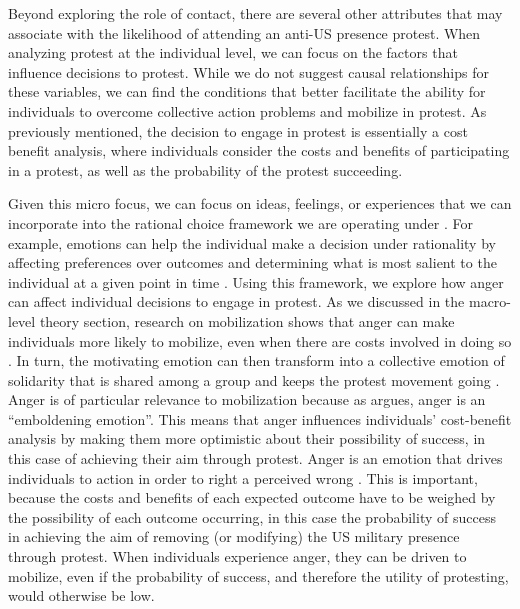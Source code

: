 Beyond exploring the role of contact, there are several other attributes that may associate with the likelihood of attending an anti-US presence protest. When analyzing protest at the individual level, we can focus on the factors that influence decisions to protest. While we do not suggest causal relationships for these variables, we can find the conditions that better facilitate the ability for individuals to overcome collective action problems and mobilize in protest. As previously mentioned, the decision to engage in protest is essentially a cost benefit analysis, where individuals consider the costs and benefits of participating in a protest, as well as the probability of the protest succeeding.
 
Given this micro focus, we can focus on ideas, feelings, or experiences that we can incorporate into the rational choice framework we are operating under \cite{Elster1999}. For example, emotions can help the individual make a decision under rationality by affecting preferences over outcomes and determining what is most salient to the individual at a given point in time \cite{deSousa1990,Pearlman2013}. Using this framework, we explore how anger can affect individual decisions to engage in protest. As we discussed in the macro-level theory section, research on mobilization shows that anger can make individuals more likely to mobilize, even when there are costs involved in doing so \cite{Gurr1968,Goodwin2009}. In turn, the motivating emotion can then transform into a collective emotion of solidarity that is shared among a group and keeps the protest movement going \cite{Goodwin2009}. Anger is of particular relevance to mobilization because as  argues, anger is an ``emboldening emotion''. This means that anger influences individuals' cost-benefit analysis by making them more optimistic about their possibility of success, in this case of achieving their aim through protest. Anger is an emotion that drives individuals to action in order to right a perceived wrong \cite{Carver2009}. This is important, because the costs and benefits of each expected outcome have to be weighed by the possibility of each outcome occurring, in this case the probability of success in achieving the aim of removing (or modifying) the US military presence through protest. When individuals experience anger, they can be driven to mobilize, even if the probability of success, and therefore the utility of protesting, would otherwise be low.  


